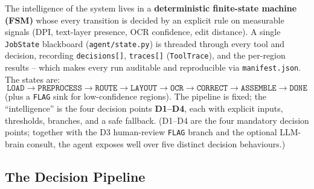 \documentclass[12pt,a4paper]{article}
\begin{document}
The intelligence of the system lives in a \textbf{deterministic finite-state machine (FSM)} whose every transition is decided by an explicit rule on measurable signals (DPI, text-layer presence, OCR confidence, edit distance). A single \texttt{JobState} blackboard (\texttt{agent/state.py}) is threaded through every tool and decision, recording \texttt{decisions[]}, \texttt{traces[]} (\texttt{ToolTrace}), and the per-region results -- which makes every run auditable and reproducible via \texttt{manifest.json}. The states are:
\[
\texttt{LOAD} \rightarrow \texttt{PREPROCESS} \rightarrow \texttt{ROUTE} \rightarrow \texttt{LAYOUT} \rightarrow \texttt{OCR} \rightarrow \texttt{CORRECT} \rightarrow \texttt{ASSEMBLE} \rightarrow \texttt{DONE}
\]
(plus a \texttt{FLAG} sink for low-confidence regions). The pipeline is fixed; the ``intelligence'' is the four decision points \textbf{D1--D4}, each with explicit inputs, thresholds, branches, and a safe fallback. (D1--D4 are the four mandatory decision points; together with the D3 human-review \texttt{FLAG} branch and the optional LLM-brain consult, the agent exposes well over five distinct decision behaviours.)

\subsection{The Decision Pipeline}
\end{document}
